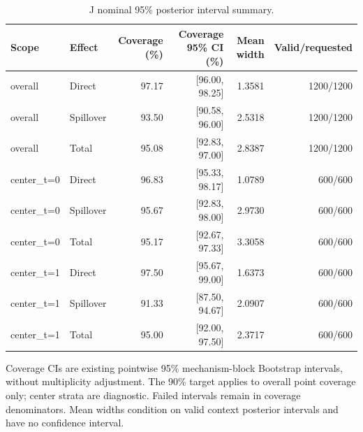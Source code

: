 \begin{table}[tb]\centering\scriptsize
\caption{J nominal 95\% posterior interval summary.}
\begin{tabular}{llrrrr}
\toprule
Scope & Effect & Coverage (\%) & Coverage 95\% CI (\%) & Mean width & Valid/requested \\
\midrule
overall & Direct & 97.17 & [96.00, 98.25] & 1.3581 & 1200/1200 \\
overall & Spillover & 93.50 & [90.58, 96.00] & 2.5318 & 1200/1200 \\
overall & Total & 95.08 & [92.83, 97.00] & 2.8387 & 1200/1200 \\
center\_t=0 & Direct & 96.83 & [95.33, 98.17] & 1.0789 & 600/600 \\
center\_t=0 & Spillover & 95.67 & [92.83, 98.00] & 2.9730 & 600/600 \\
center\_t=0 & Total & 95.17 & [92.67, 97.33] & 3.3058 & 600/600 \\
center\_t=1 & Direct & 97.50 & [95.67, 99.00] & 1.6373 & 600/600 \\
center\_t=1 & Spillover & 91.33 & [87.50, 94.67] & 2.0907 & 600/600 \\
center\_t=1 & Total & 95.00 & [92.00, 97.50] & 2.3717 & 600/600 \\
\bottomrule\end{tabular}
\par\smallskip\begin{minipage}{\linewidth}\scriptsize
Coverage CIs are existing pointwise 95\% mechanism-block Bootstrap intervals, without multiplicity adjustment. The 90\% target applies to overall point coverage only; center strata are diagnostic. Failed intervals remain in coverage denominators. Mean widths condition on valid context posterior intervals and have no confidence interval.
\end{minipage}\end{table}
